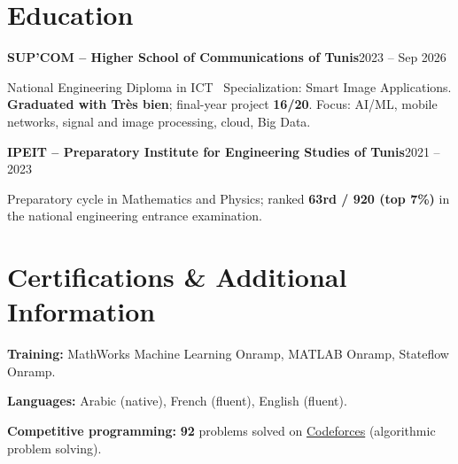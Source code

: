 \documentclass[10pt,a4paper]{article}
\begin{document}
\section{Education}
\textbf{\color{navy}SUP'COM -- Higher School of Communications of Tunis}\hfill{\fontsize{8.8}{10}\selectfont\color{gray}2023 -- Sep 2026}\par
National Engineering Diploma in ICT \textbar\ Specialization: Smart Image Applications. \textbf{Graduated with Tr\`es bien}; final-year project \textbf{16/20}. Focus: AI/ML, mobile networks, signal and image processing, cloud, Big Data.\par\vspace{5pt}
\textbf{\color{navy}IPEIT -- Preparatory Institute for Engineering Studies of Tunis}\hfill{\fontsize{8.8}{10}\selectfont\color{gray}2021 -- 2023}\par
Preparatory cycle in Mathematics and Physics; ranked \textbf{63rd / 920 (top 7\%)} in the national engineering entrance examination.

\section{Certifications \& Additional Information}
\textbf{Training:} MathWorks Machine Learning Onramp, MATLAB Onramp, Stateflow Onramp.\par\vspace{4pt}
\textbf{Languages:} Arabic (native), French (fluent), English (fluent).\par\vspace{4pt}
\textbf{Competitive programming:} \textbf{92} problems solved on \href{https://codeforces.com/profile/wael_melki}{Codeforces} (algorithmic problem solving).
\end{document}
